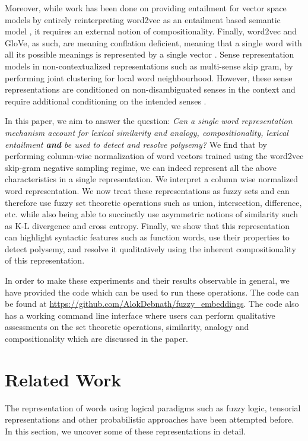 \documentclass[11pt,a4paper]{article}
\begin{document}
Moreover, while work has been done on providing entailment for vector space models by entirely reinterpreting word2vec as an entailment based semantic model \citep{henderson2016vector}, it requires an external notion of compositionality. Finally, word2vec and GloVe, as such, are meaning conflation deficient, meaning that a single word with all its possible meanings is represented by a single vector \citep{camacho2018word}. Sense representation models in non-contextualized representations such as multi-sense skip gram, by performing joint clustering for local word neighbourhood. However, these sense representations are conditioned on non-disambiguated senses in the context and require additional conditioning on the intended senses \citep{li2015multi}. 

In this paper, we aim to answer the question: \textit{Can a single word representation mechanism account for lexical similarity and analogy, compositionality, lexical entailment \textbf{and} be used to detect and resolve polysemy?} We find that by performing column-wise normalization of word vectors trained using the word2vec skip-gram negative sampling regime, we can indeed represent all the above characteristics in a single representation. We interpret a column wise normalized word representation. We now treat these representations as fuzzy sets and can therefore use fuzzy set theoretic operations such as union, intersection, difference, etc. while also being able to succinctly use asymmetric notions of similarity such as K-L divergence and cross entropy. Finally, we show that this representation can highlight syntactic features such as function words, use their properties to detect polysemy, and resolve it qualitatively using the inherent compositionality of this representation.

In order to make these experiments and their results observable in general, we have provided the code which can be used to run these operations. The code can be found at \url{https://github.com/AlokDebnath/fuzzy_embeddings}. The code also has a working command line interface where users can perform qualitative assessments on the set theoretic operations, similarity, analogy and compositionality which are discussed in the paper.

\section{Related Work}
\label{sec: related}

The representation of words using logical paradigms such as fuzzy logic, tensorial representations and other probabilistic approaches have been attempted before. In this section, we uncover some of these representations in detail. 
\end{document}
